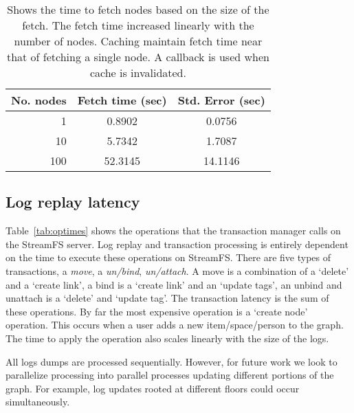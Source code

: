 \begin{table}
\begin{center}
  \begin{tabular}{| r | c  c | }
    \hline
    {\bf No. nodes } & {\bf Fetch time (sec) } & {\bf Std. Error (sec)} \\ \hline
    1 & 0.8902 & 0.0756 \\ \hline
    10 & 5.7342 & 1.7087 \\ \hline
    100 & 52.3145 & 14.1146 \\ 
    \hline
  \end{tabular}
\caption{Shows the time to fetch nodes based on the size of the fetch.  The fetch time
increased linearly with the number of nodes.  Caching maintain fetch time near
that of fetching a single node.  A callback is used when cache is invalidated.}
\label{tab:prefetchtimes}
\end{center}
\end{table}


\subsection{Log replay latency}
Table~\ref{tab:optimes} shows the  operations that the transaction manager calls on the StreamFS server.
Log replay and transaction processing is entirely dependent on the time to execute these operations on StreamFS.
There are five types of transactions, a \emph{move}, a \emph{un/bind}, \emph{un/attach}.  A move is a combination
of a `delete' and a `create link', a bind is a `create link' and an `update tags', an unbind and unattach is a
`delete' and `update tag'.  The transaction latency is the sum of these operations.  By far the most expensive
operation is a `create node' operation.  This occurs when a user adds a new item/space/person to the graph.
The time to apply the operation also scales linearly with the size of the logs.  

All logs dumps are processed sequentially.  However, for future work we look to parallelize processing into
parallel processes updating different portions of the graph.  For example, log updates rooted at different floors
could occur simultaneously.





